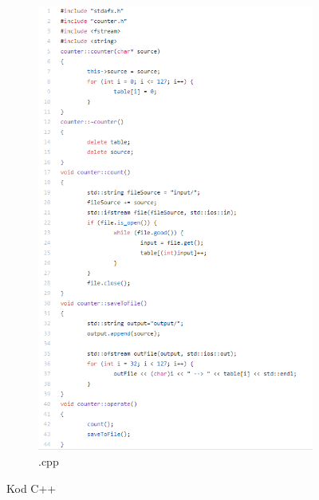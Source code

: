 \documentclass[]{article}
\begin{document}
\begin{figure}[H]
\begin{subfigure}{.5\textwidth}
		\includegraphics[width=1.4\linewidth]{cpp_code}
		\caption{.cpp}
		\label{fig:sub2}
	\end{subfigure}
	\caption{Kod C++}
	\label{fig:test}
\end{figure}
\end{document}
